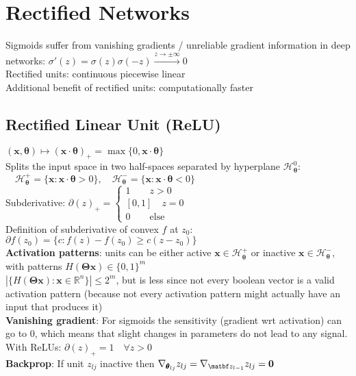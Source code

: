 \section*{Rectified Networks}
Sigmoids suffer from vanishing gradients / unreliable gradient information in deep networks: $\sigma'(z)=\sigma(z)\sigma(-z)\overset{z\rightarrow\pm\infty}{\rightarrow}0$\\
Rectified units: continuous piecewise linear\\
Additional benefit of rectified units: computationally faster
\subsection*{Rectified Linear Unit (ReLU)} $(\mathbf x,\pmb\theta)\mapsto (\mathbf x\cdot\pmb\theta)_+=\max\{0,\mathbf x\cdot\pmb\theta\}$\\
Splits the input space in two half-spaces separated by hyperplane $\mathcal H_{\pmb \theta}^0$: $\quad\mathcal H_{\pmb \theta}^+=\{\mathbf{x: x}\cdot\pmb\theta>0\}, \quad\mathcal H_{\pmb \theta}^-=\{\mathbf{x: x}\cdot\pmb\theta<0\}$ \\
Subderivative: $\partial(z)_+=\begin{cases} 1 \quad\quad z>0 \\ [0,1] \quad z=0 \\ 0 \quad\quad \text{else}
\end{cases}$\\
Definition of subderivative of convex $f$ at $z_0$: \\$\partial f(z_0)=\{c: f(z)-f(z_0)\geq c(z-z_0)\}$\\
\textbf{Activation patterns}: units can be either active $\mathbf x\in \mathcal H_{\pmb \theta}^+$ or inactive $\mathbf x \in \mathcal H_{\pmb \theta}^-$, with patterns $H(\pmb\Theta\mathbf x)\in\{0,1\}^m$\\
$|\{H(\pmb\Theta\mathbf x):\mathbf x\in\mathbb R^n\}|\leq2^m$, but is less since not every boolean vector is a valid activation pattern (because not every activation pattern might actually have an input that produces it) \\
\textbf{Vanishing gradient}: For sigmoids the sensitivity (gradient wrt activation) can go to $0$, which means that slight changes in parameters do not lead to any signal. With ReLUs: $\partial(z)_+=1\quad \forall z>0$\\
\textbf{Backprop}: If unit $z_{lj}$ inactive then $\nabla_{\pmb\theta_{lj}}z_{lj}=\nabla_{\matbf z_{l-1}}z_{lj}=\mathbf 0$\\
